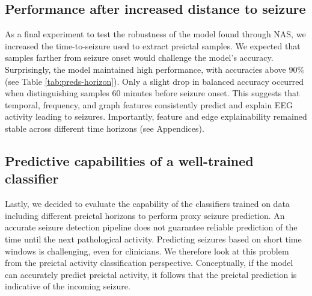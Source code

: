 \documentclass[a4paper,fleqn]{cas-sc}
\begin{document}
\subsection{Performance after increased distance to seizure}
As a final experiment to test the robustness of the model found through NAS, we increased the time-to-seizure used to extract preictal samples. We expected that samples farther from seizure onset would challenge the model's accuracy. Surprisingly, the model maintained high performance, with accuracies above 90\% (see Table \ref{tab:preds-horizon}). Only a slight drop in balanced accuracy occurred when distinguishing samples 60 minutes before seizure onset. This suggests that temporal, frequency, and graph features consistently predict and explain EEG activity leading to seizures. Importantly, feature and edge explainability remained stable across different time horizons (see Appendices).

\begin{table}[!h]
\centering
{}
\caption{Performance of \textit{GATv2} in Tab. \ref{tab:final-run} as a function of the temporal horizon used to define samples as preictal.}
\label{tab:preds-horizon}
\end{table}

\subsection{Predictive capabilities of a well-trained classifier}
Lastly, we decided to evaluate the capability of the classifiers trained on data including different preictal horizons to perform proxy seizure prediction. An accurate seizure detection pipeline does not guarantee reliable prediction of the time until the next pathological activity. Predicting seizures based on short time windows is challenging, even for clinicians. We therefore look at this problem from the preictal activity classification perspective. Conceptually, if the model can accurately predict preictal activity, it follows that the preictal prediction is indicative of the incoming seizure.
\end{document}

